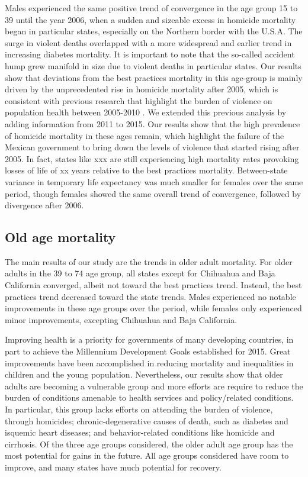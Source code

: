 \documentclass{article}
\begin{document}
Males experienced the same positive trend of convergence in the age group 15 to
39 until the year 2006, when a sudden and sizeable excess in homicide mortality
began in particular states, especially on the Northern border with the U.S.A.
The surge in violent deaths overlapped with a more widespread and earlier
trend in increasing diabetes mortality. It is important to note that the
so-called accident hump grew manifold in size due to violent deaths in
particular states. Our results show that deviations from the best practices mortality in this age-group is mainly driven by the unprecedented rise in homicide mortality after 2005, which is consistent with previous research that highlight the burden of violence on population health between 2005-2010 \citep{Aburto2015}. We extended this previous analysis by adding information from 2011 to 2015. Our results show that the high prevalence of homicide mortality in these ages remain, which highlight the failure of the Mexican government to bring down the levels of violence that started rising after 2005. In fact, states like xxx are still experiencing high mortality rates provoking losses of life of xx years relative to the best practices mortality. Between-state variance in temporary life expectancy was much smaller for females over the same period, though females showed the same overall trend of convergence, followed by
divergence after 2006.

\subsection*{Old age mortality}
The main results of our study are the trends in older adult mortality.
For older adults in the 39 to 74 age group, all states except for Chihuahua and
Baja California converged, albeit not toward the best practices trend. Instead,
the best practices trend decreased toward the state trends. Males experienced no
notable improvements in these age groups over the period, while females only
experienced minor improvements, excepting Chihuahua and
Baja California. 

Improving health is a priority for governments of many developing countries, in part to achieve the Millennium Development Goals established for 2015.  Great improvements have been accomplished in reducing mortality and inequalities in children and the young population. Nevertheless, our results show that older adults are becoming a vulnerable group and more efforts are require to reduce the burden of conditions amenable to health services and policy/related conditions. In particular, this group lacks efforts on attending the burden of violence, through homicides; chronic-degenerative
causes of death, such as diabetes and isquemic heart diseases; and behavior-related conditions like homicide and cirrhosis. Of the three age groups considered, the older adult age group
has the most potential for gains in the future. All age groups considered have
room to improve, and many states have much potential for recovery.
\end{document}
